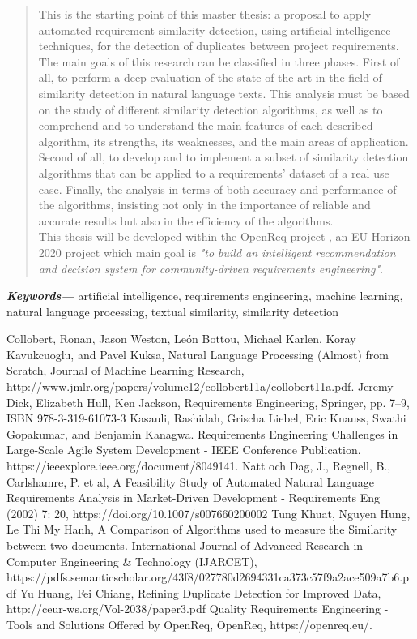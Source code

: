 \documentclass[a4paper]{article}
\providecommand{\keywords}[1]
{
  \small	
  \textbf{\textit{Keywords---}} #1
}
\begin{document}
\begin{abstract}
This is the starting point of this master thesis: a proposal to apply automated requirement similarity detection, using artificial intelligence techniques, for the detection of duplicates between project requirements. The main goals of this research can be classified in three phases. First of all, to perform a deep evaluation of the state of the art in the field of similarity detection in natural language texts. This analysis must be based on the study of different similarity detection algorithms, as well as to comprehend and to understand the main features of each described algorithm, its strengths, its weaknesses, and the main areas of application. Second of all, to develop and to implement a subset of similarity detection algorithms that can be applied to a requirements' dataset of a real use case. Finally, the analysis in terms of both accuracy and performance of the algorithms, insisting not only in the importance of reliable and accurate results but also in the efficiency of the algorithms.\\

This thesis will be developed within the OpenReq project \cite{b7}, an EU Horizon 2020 project which main goal is \textit{"to build an intelligent recommendation and decision system for community-driven require­ments engineering"}.

\end{abstract} \hspace{10pt}

\keywords{artificial intelligence, requirements engineering, machine learning, natural language processing, textual similarity, similarity detection}
\begin{thebibliography}{00}
 Collobert, Ronan, Jason Weston, León Bottou, Michael Karlen, Koray Kavukcuoglu, and Pavel Kuksa, Natural Language Processing (Almost) from Scratch, Journal of Machine Learning Research, http://www.jmlr.org/papers/volume12/collobert11a/collobert11a.pdf.
 Jeremy Dick, Elizabeth Hull, Ken Jackson, Requirements Engineering, Springer, pp. 7–9, ISBN 978-3-319-61073-3
 Kasauli, Rashidah, Grischa Liebel, Eric Knauss, Swathi Gopakumar, and Benjamin Kanagwa. Requirements Engineering Challenges in Large-Scale Agile System Development - IEEE Conference Publication. https://ieeexplore.ieee.org/document/8049141.
 Natt och Dag, J., Regnell, B., Carlshamre, P. et al, A Feasibility Study of Automated Natural Language Requirements Analysis in Market-Driven Development -  Requirements Eng (2002) 7: 20, https://doi.org/10.1007/s007660200002
 Tung Khuat, Nguyen Hung, Le Thi My Hanh, A Comparison of Algorithms used to measure the Similarity between two documents. International Journal of Advanced Research in Computer Engineering \& Technology (IJARCET), https://pdfs.semanticscholar.org/43f8/027780d2694331ca373c57f9a2ace509a7b6.pdf
 Yu Huang, Fei Chiang, Refining Duplicate Detection for Improved Data, http://ceur-ws.org/Vol-2038/paper3.pdf
Quality
 Requirements Engineering - Tools and Solutions Offered by OpenReq, OpenReq, https://openreq.eu/.

\end{thebibliography}




\end{document}

